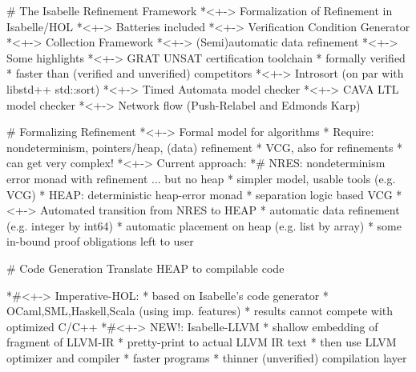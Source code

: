 \documentclass[fleqn]{beamer}
\begin{document}
# The Isabelle Refinement Framework
  *<+-> Formalization of Refinement in Isabelle/HOL
  *<+-> Batteries included
    *<+-> Verification Condition Generator
    *<+-> Collection Framework
    *<+-> (Semi)automatic data refinement
  *<+-> Some highlights
    *<+-> GRAT UNSAT certification toolchain
      * formally verified
      * faster than (verified and unverified) competitors
    *<+-> Introsort (on par with libstd++ std::sort)
    *<+-> Timed Automata model checker
    *<+-> CAVA LTL model checker
    *<+-> Network flow (Push-Relabel and Edmonds Karp)


# Formalizing Refinement
  *<+-> Formal model for algorithms
    * Require: nondeterminism, pointers/heap, (data) refinement
    * VCG, also for refinements
    * can get very complex!
  *<+-> Current approach:
    *# NRES: nondeterminism error monad with refinement ... but no heap
      * simpler model, usable tools (e.g. VCG)
    * HEAP: deterministic heap-error monad
      * separation logic based VCG
  *<+-> Automated transition from NRES to HEAP
    * automatic data refinement (e.g. integer by int64)
    * automatic placement on heap (e.g. list by array)
    * some in-bound proof obligations left to user



# Code Generation
  Translate HEAP to compilable code
  \onslide<+->

  \begin{minipage}{.69\textwidth}
  *#<+-> Imperative-HOL:
    * based on Isabelle's code generator
    * OCaml,SML,Haskell,Scala (using imp. features)
    * results cannot compete with optimized C/C++
  *#<+-> NEW!: Isabelle-LLVM
    * shallow embedding of fragment of LLVM-IR
    * pretty-print to actual LLVM IR text
    * then use LLVM optimizer and compiler
    * faster programs
    * thinner (unverified) compilation layer
  \end{minipage}%
  \begin{minipage}{.3\textwidth}
  \end{minipage}
\end{document}

